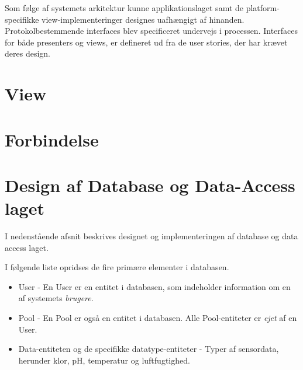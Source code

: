 Som følge af systemets arkitektur kunne applikationslaget samt de platform-specifikke view-implementeringer
designes uafhængigt af hinanden. Protokolbestemmende interfaces blev specificeret undervejs i processen. Interfaces for både presenters og views, er defineret ud fra de user stories, der har krævet deres design.



\section{View}








\section{Forbindelse}



\section{Design af Database og Data-Access laget}\label{sec:designdatabase}
I nedenstående afsnit beskrives designet og implementeringen af database og data access laget.

I følgende liste opridses de fire primære elementer i databasen.

\begin{itemize}
	\item User - En User er en entitet i databasen, som indeholder information om en af systemets \textit{brugere}.
	\item Pool - En Pool er også en entitet i databasen. Alle Pool-entiteter er \textit{ejet} af en User.
	\item Data-entiteten og de specifikke datatype-entiteter - Typer af sensordata, herunder klor, pH, temperatur og luftfugtighed.
\end{itemize}


